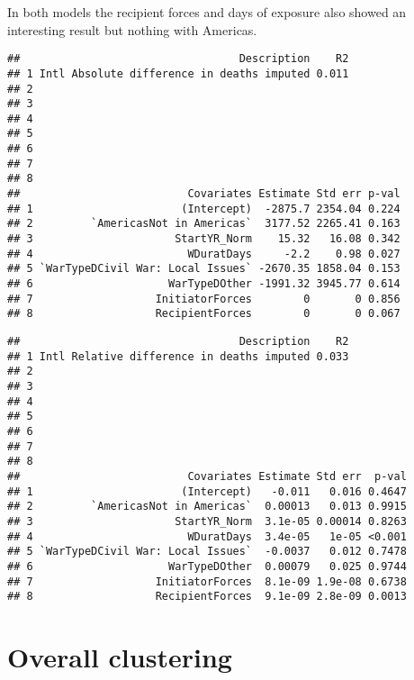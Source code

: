 \documentclass[
]{article}
\begin{document}
In both models the recipient forces and days of exposure also showed an
interesting result but nothing with Americas.

\begin{verbatim}
##                                  Description    R2
## 1 Intl Absolute difference in deaths imputed 0.011
## 2                                                 
## 3                                                 
## 4                                                 
## 5                                                 
## 6                                                 
## 7                                                 
## 8                                                 
##                          Covariates Estimate Std err p-val
## 1                       (Intercept)  -2875.7 2354.04 0.224
## 2         `AmericasNot in Americas`  3177.52 2265.41 0.163
## 3                      StartYR_Norm    15.32   16.08 0.342
## 4                        WDuratDays     -2.2    0.98 0.027
## 5 `WarTypeDCivil War: Local Issues` -2670.35 1858.04 0.153
## 6                     WarTypeDOther -1991.32 3945.77 0.614
## 7                   InitiatorForces        0       0 0.856
## 8                   RecipientForces        0       0 0.067
\end{verbatim}

\begin{verbatim}
##                                  Description    R2
## 1 Intl Relative difference in deaths imputed 0.033
## 2                                                 
## 3                                                 
## 4                                                 
## 5                                                 
## 6                                                 
## 7                                                 
## 8                                                 
##                          Covariates Estimate Std err  p-val
## 1                       (Intercept)   -0.011   0.016 0.4647
## 2         `AmericasNot in Americas`  0.00013   0.013 0.9915
## 3                      StartYR_Norm  3.1e-05 0.00014 0.8263
## 4                        WDuratDays  3.4e-05   1e-05 <0.001
## 5 `WarTypeDCivil War: Local Issues`  -0.0037   0.012 0.7478
## 6                     WarTypeDOther  0.00079   0.025 0.9744
## 7                   InitiatorForces  8.1e-09 1.9e-08 0.6738
## 8                   RecipientForces  9.1e-09 2.8e-09 0.0013
\end{verbatim}

\hypertarget{overall-clustering}{%
\section{Overall clustering}\label{overall-clustering}}
\end{document}
